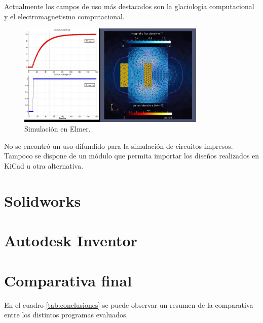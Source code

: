 \documentclass[
    11pt,
    spanish,
    a4paper
]{article}
\begin{document}
Actualmente los campos de uso más destacados son la glaciología computacional y el electromagnetismo computacional.

\begin{figure}[htbp]
	\centering
	\includegraphics[width=0.8\textwidth]{img/elmer.jpg}
	\caption{Simulación en Elmer.}
	\label{fig:elmer}
\end{figure}

No se encontró un uso difundido para la simulación de circuitos impresos.
Tampoco se dispone de un módulo que permita importar los diseños realizados en KiCad u otra alternativa.


\section{Solidworks}


\section{Autodesk Inventor}


\section{Comparativa final}

En el cuadro \ref{tab:conclusiones} se puede observar un resumen de la comparativa entre los distintos programas evaluados.
\end{document}
